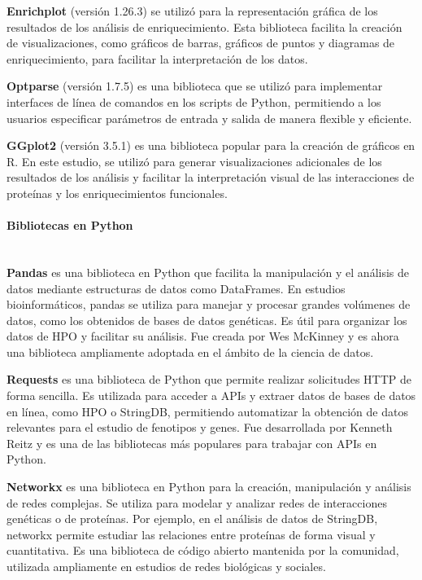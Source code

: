 \textbf{Enrichplot} (versión 1.26.3) se utilizó para la representación gráfica de los resultados de los análisis de enriquecimiento. Esta biblioteca facilita la creación de visualizaciones, como gráficos de barras, gráficos de puntos y diagramas de enriquecimiento, para facilitar la interpretación de los datos. \cite{enrichplotmanual}

\textbf{Optparse} (versión 1.7.5) es una biblioteca que se utilizó para implementar interfaces de línea de comandos en los scripts de Python, permitiendo a los usuarios especificar parámetros de entrada y salida de manera flexible y eficiente.\cite{optparse}

\textbf{GGplot2} (versión 3.5.1) es una biblioteca popular para la creación de gráficos en R. En este estudio, se utilizó para generar visualizaciones adicionales de los resultados de los análisis y facilitar la interpretación visual de las interacciones de proteínas y los enriquecimientos funcionales. \cite{ggplot2}


\paragraph{Bibliotecas en Python} \mbox{}\\

\textbf{Pandas} es una biblioteca en Python que facilita la manipulación y el análisis de datos mediante estructuras de datos como DataFrames.
En estudios bioinformáticos, pandas se utiliza para manejar y procesar grandes volúmenes de datos, como los obtenidos de bases de datos genéticas. Es útil para organizar los datos de HPO y facilitar su análisis.
Fue creada por Wes McKinney y es ahora una biblioteca ampliamente adoptada en el ámbito de la ciencia de datos.\cite{mckinney2011pandas}


\textbf{Requests} es una biblioteca de Python que permite realizar solicitudes HTTP de forma sencilla.
Es utilizada para acceder a APIs y extraer datos de bases de datos en línea, como HPO o StringDB, permitiendo automatizar la obtención de datos relevantes para el estudio de fenotipos y genes.
Fue desarrollada por Kenneth Reitz y es una de las bibliotecas más populares para trabajar con APIs en Python.\cite{chandra2015python}


\textbf{Networkx} es una biblioteca en Python para la creación, manipulación y análisis de redes complejas.
Se utiliza para modelar y analizar redes de interacciones genéticas o de proteínas. Por ejemplo, en el análisis de datos de StringDB, networkx permite estudiar las relaciones entre proteínas de forma visual y cuantitativa.
Es una biblioteca de código abierto mantenida por la comunidad, utilizada ampliamente en estudios de redes biológicas y sociales.\cite{hagberg2020networkx}


